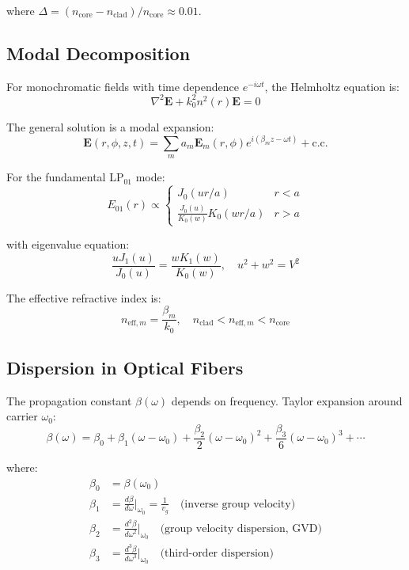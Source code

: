 \documentclass[12pt,a4paper]{article}
\begin{document}
where $\Delta = (n_{\text{core}} - n_{\text{clad}})/n_{\text{core}} \approx 0.01$.

\subsection{Modal Decomposition}

For monochromatic fields with time dependence $e^{-i\omega t}$, the Helmholtz equation is:
\begin{equation}
\nabla^2 \mathbf{E} + k_0^2 n^2(r) \mathbf{E} = 0
\end{equation}

The general solution is a modal expansion:
\begin{equation}
\mathbf{E}(r, \phi, z, t) = \sum_m a_m \mathbf{E}_m(r, \phi) e^{i(\beta_m z - \omega t)} + \text{c.c.}
\end{equation}

For the fundamental LP$_{01}$ mode:
\begin{equation}
E_{01}(r) \propto \begin{cases}
J_0(ur/a) & r < a \\
\frac{J_0(u)}{K_0(w)}K_0(wr/a) & r > a
\end{cases}
\end{equation}

with eigenvalue equation:
\begin{equation}
\frac{u J_1(u)}{J_0(u)} = \frac{w K_1(w)}{K_0(w)}, \quad u^2 + w^2 = V^2
\end{equation}

The effective refractive index is:
\begin{equation}
n_{\text{eff},m} = \frac{\beta_m}{k_0}, \quad n_{\text{clad}} < n_{\text{eff},m} < n_{\text{core}}
\end{equation}

\subsection{Dispersion in Optical Fibers}

The propagation constant $\beta(\omega)$ depends on frequency. Taylor expansion around carrier $\omega_0$:
\begin{equation}
\beta(\omega) = \beta_0 + \beta_1(\omega - \omega_0) + \frac{\beta_2}{2}(\omega - \omega_0)^2 + \frac{\beta_3}{6}(\omega - \omega_0)^3 + \cdots
\end{equation}

where:
\begin{align}
\beta_0 &= \beta(\omega_0) \\
\beta_1 &= \frac{d\beta}{d\omega}\bigg|_{\omega_0} = \frac{1}{v_g} \quad \text{(inverse group velocity)} \\
\beta_2 &= \frac{d^2\beta}{d\omega^2}\bigg|_{\omega_0} \quad \text{(group velocity dispersion, GVD)} \\
\beta_3 &= \frac{d^3\beta}{d\omega^3}\bigg|_{\omega_0} \quad \text{(third-order dispersion)}
\end{align}
\end{document}
